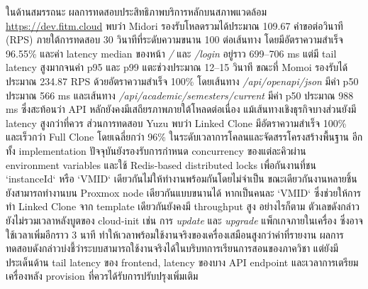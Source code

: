 \hspace*{1.3em}
ในด้านสมรรถนะ ผลการทดสอบประสิทธิภาพบริการหลักบนสภาพแวดล้อม \url{https://dev.fitm.cloud} พบว่า Midori รองรับโหลดรวมได้ประมาณ 109.67 คำขอต่อวินาที (RPS) ภายใต้การทดสอบ 30 วินาทีที่ระดับความขนาน 100 ต่อเส้นทาง โดยมีอัตราความสำเร็จ 96.55\% และค่า latency median ของหน้า \textit{/} และ \textit{/login} อยู่ราว 699--706 ms แต่มี tail latency สูงมากจนค่า p95 และ p99 แตะช่วงประมาณ 12--15 วินาที ขณะที่ Momoi รองรับได้ประมาณ 234.87 RPS ด้วยอัตราความสำเร็จ 100\% โดยเส้นทาง \textit{/api/openapi/json} มีค่า p50 ประมาณ 566 ms และเส้นทาง \textit{/api/academic/semesters/current} มีค่า p50 ประมาณ 988 ms ซึ่งสะท้อนว่า API หลักยังคงมีเสถียรภาพภายใต้โหลดต่อเนื่อง แม้เส้นทางเชิงธุรกิจบางส่วนยังมี latency สูงกว่าที่ควร ส่วนการทดสอบ Yuzu พบว่า Linked Clone มีอัตราความสำเร็จ 100\% และเร็วกว่า Full Clone โดยเฉลี่ยกว่า 96\% ในระดับเวลาการโคลนและจัดสรรโครงสร้างพื้นฐาน อีกทั้ง implementation ปัจจุบันยังรองรับการกำหนด concurrency ของแต่ละคิวผ่าน environment variables และใช้ Redis-based distributed locks เพื่อกันงานที่ชน `instanceId` หรือ `VMID` เดียวกันไม่ให้ทำงานพร้อมกันโดยไม่จำเป็น ขณะเดียวกันงานหลายชิ้นยังสามารถทำงานบน Proxmox node เดียวกันแบบขนานได้ หากเป็นคนละ `VMID` ซึ่งช่วยให้การทำ Linked Clone จาก template เดียวกันยังคงมี throughput สูง อย่างไรก็ตาม ตัวเลขดังกล่าวยังไม่รวมเวลาหลังบูตของ cloud-init เช่น การ \textit{update} และ \textit{upgrade} แพ็กเกจภายในเครื่อง ซึ่งอาจใช้เวลาเพิ่มอีกราว 3 นาที ทำให้เวลาพร้อมใช้งานจริงของเครื่องเสมือนสูงกว่าค่าที่รายงาน ผลการทดสอบดังกล่าวบ่งชี้ว่าระบบสามารถใช้งานจริงได้ในบริบทการเรียนการสอนของภาควิชา แต่ยังมีประเด็นด้าน tail latency ของ frontend, latency ของบาง API endpoint และเวลาการเตรียมเครื่องหลัง provision ที่ควรได้รับการปรับปรุงเพิ่มเติม

